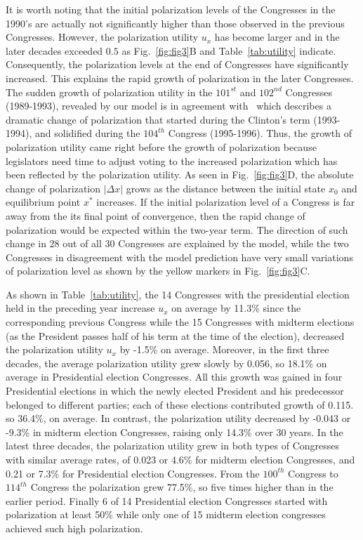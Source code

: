 It is worth noting that the initial polarization levels of the Congresses in the 1990's are actually not significantly higher than those observed in the previous Congresses. However, the polarization utility $u_x$ has become larger and in the later decades exceeded $0.5$ as Fig.~\ref{fig:fig3}B and Table~\ref{tab:utility} indicate. Consequently, the polarization levels at the end of Congresses have significantly increased. This explains the rapid growth of polarization in the later Congresses. The sudden growth of polarization utility in the $101^{st}$ and $102^{nd}$ Congresses (1989-1993), revealed by our model is in agreement with~\cite{moody2013portrait} which describes a dramatic change of polarization that started during the Clinton's term (1993-1994), and solidified during the $104^{th}$ Congress (1995-1996). Thus, the growth of polarization utility came right before the growth of polarization because legislators need time to adjust voting to the increased polarization which has been reflected by the polarization utility. As seen in Fig.~\ref{fig:fig3}D, the absolute change of polarization $|\Delta x|$ grows as the distance between the initial state $x_0$ and equilibrium point $x^*$ increases. If the initial polarization level of a Congress is far away from the its final point of convergence, then the rapid change of polarization would be expected within the two-year term. The direction of such change in $28$ out of all $30$ Congresses are explained by the model, while the two Congresses in disagreement with the model prediction have very small variations of polarization level as shown by the yellow markers in Fig.~\ref{fig:fig3}C. 

As shown in Table~\ref{tab:utility}, the 14 Congresses with the presidential election held in the preceding year increase $u_x$ on average by 11.3\% since the corresponding previous Congress while the 15 Congresses with midterm elections (as the President passes half of his term at the time of the election), decreased the polarization utility $u_x$ by -1.5\% on average. Moreover, in the first three decades, the average polarization utility grew slowly by 0.056, so 18.1\% on average in Presidential election Congresses. All this growth was gained in four Presidential elections in which the newly elected President and his predecessor belonged to different parties; each of these elections contributed growth of 0.115. so 36.4\%, on average. In contrast, the polarization utility decreased by -0.043 or -9.3\% in midterm election Congresses, raising only 14.3\% over 30 years. 
In the latest three decades, the polarization utility grew in both types of Congresses with similar average rates, of  0.023 or 4.6\% for midterm election Congresses, and 0.21 or 7.3\% for Presidential election Congresses. From the $100^{th}$ Congress to $114^{th}$ Congress the polarization grew 77.5\%, so five times higher than in the earlier period. Finally 6 of 14 Presidential election Congresses started with polarization at least 50\% while only one of 15 midterm election congresses achieved such high polarization.

